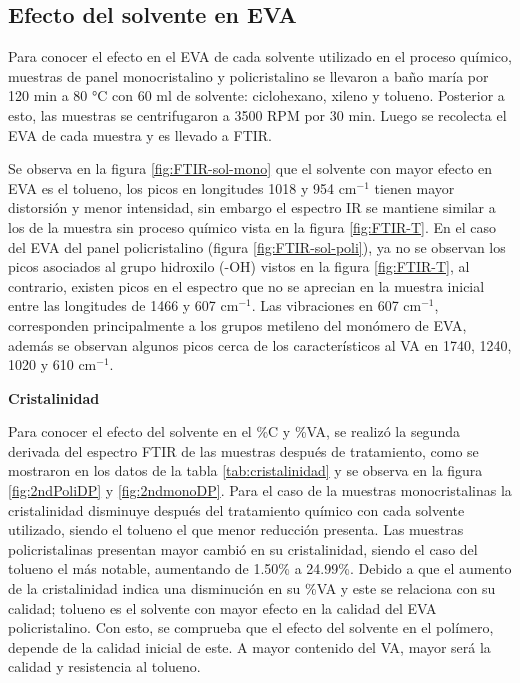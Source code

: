\subsection{Efecto del solvente en EVA}

Para conocer el efecto en el EVA de cada solvente utilizado en el proceso químico, muestras de panel monocristalino y policristalino se llevaron a baño maría por 120 min a 80 °C con 60 ml de solvente: ciclohexano, xileno y tolueno. Posterior a esto, las muestras se centrifugaron a 3500 RPM por 30 min. Luego se recolecta el EVA de cada muestra y es llevado a FTIR. 

Se observa en la figura \ref{fig:FTIR-sol-mono} que el solvente con mayor efecto en EVA es el tolueno, los picos en longitudes 1018 y 954 cm$^{-1}$ tienen mayor distorsión y menor intensidad, sin embargo el espectro IR se mantiene similar a los de la muestra sin proceso químico vista en la figura \ref{fig:FTIR-T}. En el caso del EVA del panel policristalino (figura \ref{fig:FTIR-sol-poli}), ya no se observan los picos asociados al grupo hidroxilo (-OH) vistos en la figura \ref{fig:FTIR-T}, al contrario, existen picos en el espectro que no se aprecian en la muestra inicial entre las longitudes de  1466 y 607 cm$^{-1}$. Las vibraciones en 607 cm$^{-1}$, corresponden principalmente a los grupos metileno del monómero de EVA, además se observan algunos picos cerca de los característicos al VA en 1740, 1240, 1020 y 610 cm$^{-1}$.  

\textbf{Cristalinidad} 

Para conocer el efecto del solvente en el $\%$C y \%VA, se realizó la segunda derivada del espectro FTIR de las muestras después de tratamiento, como se mostraron en los datos de la tabla \ref{tab:cristalinidad} y se observa en la figura \ref{fig:2ndPoliDP} y \ref{fig:2ndmonoDP}. 
Para el caso de la muestras monocristalinas la cristalinidad disminuye después del tratamiento químico con cada solvente utilizado, siendo el tolueno el que menor reducción presenta. Las muestras policristalinas presentan mayor cambió en su cristalinidad, siendo el caso del tolueno el más notable, aumentando de 1.50\% a 24.99\%. Debido a que el aumento de la cristalinidad indica una disminución en su \%VA y este se relaciona con su calidad; tolueno es el solvente con mayor efecto en la calidad del EVA policristalino. Con esto, se comprueba que el efecto del solvente en el polímero, depende de la calidad inicial de este. A mayor contenido del VA, mayor será la calidad y resistencia al tolueno. 

